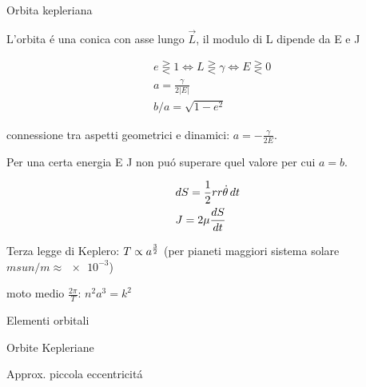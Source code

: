 \begin{wordonframe}{Orbita kepleriana}

L'orbita \'e una conica con asse lungo $\vec{L}$, il modulo di L dipende da E e J

\begin{align*}
&e\gtreqless1\Leftrightarrow L\gtreqless\gamma\Leftrightarrow E\gtreqless0\\
&a=\frac{\gamma}{2|E|}\\
&b/a=\sqrt{1-e^2}
\end{align*}

connessione tra aspetti geometrici e dinamici: $a=-\frac{\gamma}{2E}$.

Per una certa energia E J non pu\'o superare quel valore per cui $a=b$.

\begin{align*}
&dS=\frac{1}{2}rr\dot{\theta}\,dt\\
&J=2\mu\TDy{t}{S}
\end{align*}

Terza legge di Keplero: $T\propto a\expy{\frac{3}{2}}$ (per pianeti maggiori sistema solare $msun{}/m\approx\num{e-3}$)

moto medio $\frac{2\pi}{T}$: $n^2a^3=k^2$

\end{wordonframe}


\begin{frame}{Elementi orbitali}



\end{frame}


\begin{frame}{Orbite Kepleriane}

\end{frame}

\begin{frame}{Approx. piccola eccentricit\'a}

\end{frame}

